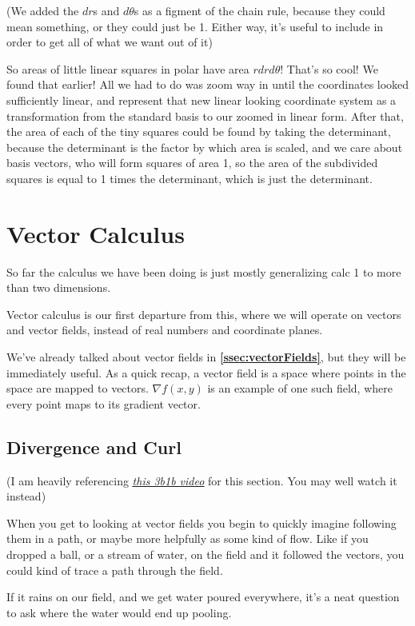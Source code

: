\documentclass[12pt, letterpaper]{article}
\newcommand{\externalLink}[2]{\emph{\underline{\href{#1}{#2}}}}
\begin{document}
(We added the $dr$s and $d\theta$s as a figment of the chain rule, because they could mean something, or they could just be 1. 
Either way, it's useful to include in order to get all of what we want out of it)

So areas of little linear squares in polar have area $rdrd\theta$!
That's so cool! We found that earlier!
All we had to do was zoom way in until the coordinates looked sufficiently linear,
and represent that new linear looking coordinate system as a transformation from the standard basis to our zoomed in linear form.
After that, the area of each of the tiny squares could be found by taking the determinant, because the determinant is the factor by which area is scaled,
and we care about basis vectors, who will form squares of area 1, so the area of the subdivided squares is equal to 1 times the determinant, which is just the determinant.

\section{Vector Calculus}
So far the calculus we have been doing is just mostly generalizing calc 1 to more than two dimensions.

Vector calculus is our first departure from this, where we will operate on vectors and vector fields, instead of real numbers and coordinate planes.

We've already talked about vector fields in \textbf{\ref{ssec:vectorFields}}, but they will be immediately useful.
As a quick recap, a vector field is a space where points in the space are mapped to vectors.
$\nabla f(x, y)$ is an example of one such field, where every point maps to its gradient vector. 

\subsection{Divergence and Curl}
({I am heavily referencing \externalLink{https://www.youtube.com/watch?v=rB83DpBJQsE}{this 3b1b video} for this section. You may well watch it instead})


When you get to looking at vector fields you begin to quickly imagine following them in a path, or maybe more helpfully as some kind of flow.
Like if you dropped a ball, or a stream of water, on the field and it followed the vectors, you could kind of trace a path through the field.

If it rains on our field, and we get water poured everywhere, it's a neat question to ask where the water would end up pooling.
\end{document}
